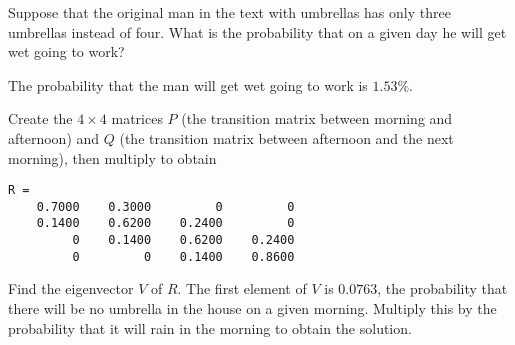 \documentclass{ximera}
\begin{document}
\begin{exercise} \label{c4.10.9}
Suppose that the original man in the text with umbrellas has only three
umbrellas instead of four.  What is the probability that on a given day he
will get wet going to work?

\begin{solution}

\ans The probability that the man will get wet going to work is $1.53\%$.

\soln Create the $4 \times 4$ matrices $P$ (the transition matrix between
morning and afternoon) and $Q$ (the transition matrix between afternoon
and the next morning), then multiply to obtain \begin{verbatim}
R =
    0.7000    0.3000         0         0
    0.1400    0.6200    0.2400         0
         0    0.1400    0.6200    0.2400
         0         0    0.1400    0.8600
\end{verbatim}
Find the eigenvector $V$ of $R$.  The first element of $V$ is $0.0763$,
the probability that there will be no umbrella in the house on a given
morning.  Multiply this by the probability that it will rain in the
morning to obtain the solution.



\end{solution}
\end{exercise}
\end{document}
